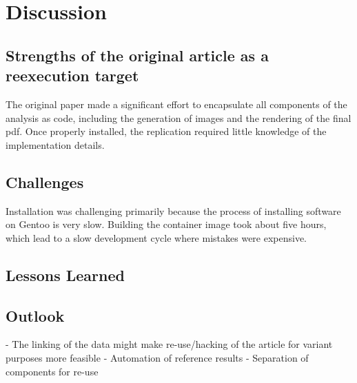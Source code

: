 \section{Discussion}

\subsection{Strengths of the original article as a reexecution target}
The original paper made a significant effort to encapsulate all
components of the analysis as code, including the generation of images
and the rendering of the final pdf. Once properly installed, the
replication required little knowledge of the implementation details.

\subsection{Challenges}
Installation was challenging primarily because the process of installing
software on Gentoo is very slow. Building the container image took
about five hours, which lead to a slow development cycle where mistakes
were expensive.

\subsection{Lessons Learned}

\subsection{Outlook}
- The linking of the data might make re-use/hacking of the article for variant purposes more feasible
- Automation of reference results
- Separation of components for re-use
